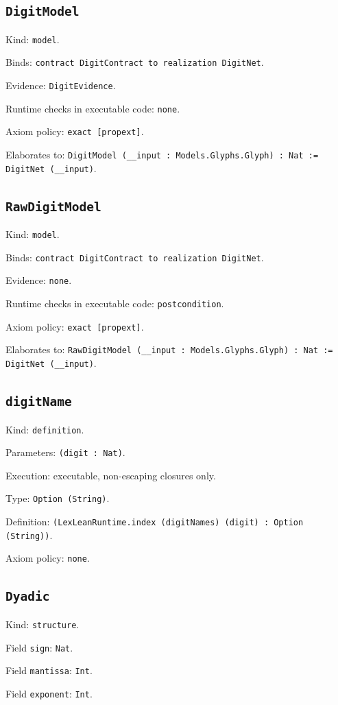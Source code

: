 \documentclass[11pt]{article}
\begin{document}
\subsection*{\texttt{DigitModel}}
\noindent Kind: \texttt{model}.\par
\noindent Binds: \texttt{contract DigitContract to realization DigitNet}.\par
\noindent Evidence: \texttt{DigitEvidence}.\par
\noindent Runtime checks in executable code: \texttt{none}.\par
\noindent Axiom policy: \texttt{exact [propext]}.\par
\noindent Elaborates to: \texttt{DigitModel (\_\_input : Models.Glyphs.Glyph) : Nat := DigitNet (\_\_input)}.\par
\subsection*{\texttt{RawDigitModel}}
\noindent Kind: \texttt{model}.\par
\noindent Binds: \texttt{contract DigitContract to realization DigitNet}.\par
\noindent Evidence: \texttt{none}.\par
\noindent Runtime checks in executable code: \texttt{postcondition}.\par
\noindent Axiom policy: \texttt{exact [propext]}.\par
\noindent Elaborates to: \texttt{RawDigitModel (\_\_input : Models.Glyphs.Glyph) : Nat := DigitNet (\_\_input)}.\par
\subsection*{\texttt{digitName}}
\noindent Kind: \texttt{definition}.\par
\noindent Parameters: \texttt{(digit : Nat)}.\par
\noindent Execution: executable, non-escaping closures only.\par
\noindent Type: \texttt{Option (String)}.\par
\noindent Definition: \texttt{(LexLeanRuntime.index (digitNames) (digit) : Option (String))}.\par
\noindent Axiom policy: \texttt{none}.\par
\subsection*{\texttt{Dyadic}}
\noindent Kind: \texttt{structure}.\par
\noindent Field \texttt{sign}: \texttt{Nat}.\par
\noindent Field \texttt{mantissa}: \texttt{Int}.\par
\noindent Field \texttt{exponent}: \texttt{Int}.\par
\end{document}
